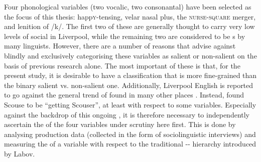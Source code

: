 Four phonological variables (two vocalic, two consonantal) have been selected as the focus of this thesis: happ\textsc{y}-tensing, velar nasal plus, the \textsc{nurse}-\textsc{square} merger, and lenition of /k/.
The first two of these are generally thought to carry very low levels of social  in Liverpool, while the remaining two are considered to be s by many linguists.
However, there are a number of reasons that advise against blindly and exclusively categorising these variables as salient or non-salient on the basis of previous research alone.
The most important of these is that, for the present study, it is desirable to have a classification that is more fine-grained than the binary salient vs. non-salient one.
Additionally, Liverpool English is reported to go against the general trend of  found in many other places \parencite{kerswill2003}.
Instead, \textcite[237]{watson2007a} found Scouse to be ``getting Scouser'', at least with respect to some variables.
Especially against the backdrop of this ongoing , it is therefore necessary to independently ascertain the  of the four variables under scrutiny here first.
This is done by analysing production data (collected in the form of sociolinguistic interviews) and measuring the  of a variable with respect to the traditional -- hierarchy introduced by Labov.


